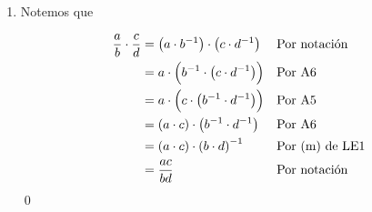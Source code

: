 \documentclass[11pt]{article}
\begin{document}
\begin{enumerate}[label=\alph*),font=\bfseries]
\begin{align*}
\frac{a}{b} \pm \frac{c}{d}  &=	a \cdot b^{-1} \pm c \cdot d^{-1} && \text{Por notación}\\
&=	\left( a \cdot 1 \right)   \cdot b^{-1} \pm \left( c \cdot 1 \right) \cdot d^{-1} && \text{Por A7}\\
&=	\Bigl( a \cdot  \left( d \cdot d^{-1} \right) \Bigr) \cdot b^{-1} \pm \Bigl( c \cdot  \left( b \cdot b^{-1}  \right)  \Bigr)  \cdot d^{-1} && \text{Por A8}\\
&=	\Bigl(  \left( a \cdot d \right) \cdot d^{-1} \Bigr) \cdot b^{-1} \pm \Bigl(  \left( c \cdot b \right) \cdot b^{-1} \Bigr) \cdot d^{-1} && \text{Por A6}\\
&=	\left( a \cdot d \right)  \cdot  \left( d^{-1} \cdot b^{-1}  \right) \pm \left( c \cdot b \right)  \cdot  \left( b^{-1} \cdot d^{-1}  \right) && \text{Por A6}\\
&=	\left( a \cdot d \right)  \cdot  \left( b^{-1} \cdot d^{-1}  \right) \pm \left( c \cdot b \right)  \cdot  \left( b^{-1} \cdot d^{-1}  \right) && \text{Por A5}\\
&=	\left( b^{-1} \cdot d^{-1}  \right) \cdot \left( a \cdot d \pm c \cdot b \right) && \text{Por A9}\\
&=	\left( a \cdot d \pm c \cdot b \right) \cdot  \left( b^{-1} \cdot d^{-1} \right) && \text{Por A5}\\
&=	\left( a \cdot d \pm c \cdot b \right) \cdot  \left( b \cdot d \right)^{-1} && \text{Por (m) de LE1}\\
&=	\left( a \cdot d \pm b \cdot c \right) \cdot \left( b \cdot d \right)^{-1} && \text{Por A5}\\
&=	\frac{ad \pm bc}{bd} && \text{Por notación}\\
\end{align*}
\qed


\item Notemos que

\begin{align*}
    \frac{a}{b} \cdot \frac{c}{d} &= \left( a \cdot b^{-1} \right) \cdot \left( c \cdot d^{-1} \right) && \text{Por notación}\\
        &= a \cdot \Bigl( b^{-1} \cdot \left( c \cdot d^{-1} \right) \Bigr) && \text{Por A6}\\
            &= a \cdot \Bigl( c \cdot \left( b^{-1} \cdot d^{-1} \right) \Bigr) && \text{Por A5}\\
	&= \left( a \cdot c \right) \cdot \left( b^{-1} \cdot d^{-1} \right) && \text{Por A6}\\
	&= \left( a \cdot c \right) \cdot \left( b \cdot d \right)^{-1} && \text{Por (m) de LE1}\\
	&= \frac{ac}{bd} && \text{Por notación}\\
\end{align*}
\qed


\end{enumerate}
\end{document}
